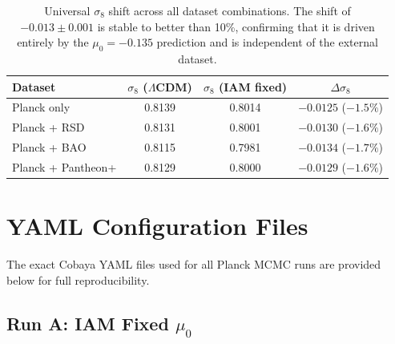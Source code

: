 \documentclass[11pt,letterpaper]{article}
\begin{document}
\begin{table}[h]
\centering
\begin{tabular}{lccc}
\toprule
Dataset & $\sigma_8$ ($\Lambda$CDM) & $\sigma_8$ (IAM fixed) & $\Delta\sigma_8$ \\
\midrule
Planck only & 0.8139 & 0.8014 & $-0.0125$ ($-1.5\%$) \\
Planck + RSD & 0.8131 & 0.8001 & $-0.0130$ ($-1.6\%$) \\
Planck + BAO & 0.8115 & 0.7981 & $-0.0134$ ($-1.7\%$) \\
Planck + Pantheon+ & 0.8129 & 0.8000 & $-0.0129$ ($-1.6\%$) \\
\bottomrule
\end{tabular}
\caption{Universal $\sigma_8$ shift across all dataset combinations. The shift of $-0.013 \pm 0.001$ is stable to better than 10\%, confirming that it is driven entirely by the $\mu_0 = -0.135$ prediction and is independent of the external dataset.}
\label{tab:sigma8_shift}
\end{table}

\section{YAML Configuration Files}
\label{sec:yaml}

The exact Cobaya YAML files used for all Planck MCMC runs are provided below for full reproducibility.

\subsection{Run A: IAM Fixed $\mu_0$}
\end{document}
